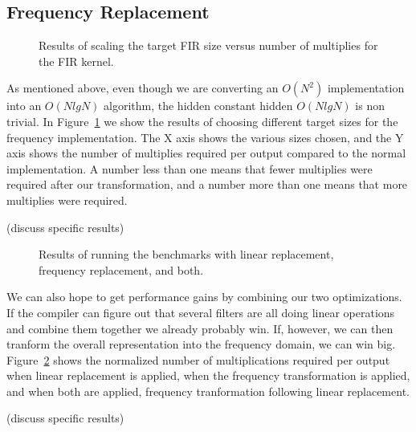 \subsection{Frequency Replacement}
\begin{figure}
\center
\epsfxsize=3.0in
\caption{Results of scaling the target FIR size versus number of multiplies for the FIR kernel.}
\label{fig:freq-scaling}
\end{figure}

As mentioned above, even though we are converting an $O(N^2)$ implementation into an
$O(N lg N)$ algorithm, the hidden constant hidden $O(N lg N)$ is non trivial. In
Figure~\ref{fig:freq-scaling} we show the results of choosing different target sizes
for the frequency implementation. The X axis shows the various sizes chosen, and 
the Y axis shows the number of multiplies required per output compared to the normal
implementation. A number less than one means that fewer multiplies were required after
our transformation, and a number more than one means that more multiplies were required.

(discuss specific results)

\begin{figure}
\center
\epsfxsize=3.0in
\caption{Results of running the benchmarks with linear replacement, frequency replacement, and both.}
\label{fig:linear-freq-both}
\end{figure}

We can also hope to get performance gains by combining our two optimizations. 
If the compiler can figure out that several filters are all doing linear operations
and combine them together we already probably win. If, however, we can then tranform
the overall representation into the frequency domain, we can win big. 
Figure~\ref{fig:linear-freq-both} shows the normalized number of multiplications
required per output when linear replacement is applied, when the frequency transformation 
is applied, and when both are applied, frequency tranformation following linear replacement.

(discuss specific results)
